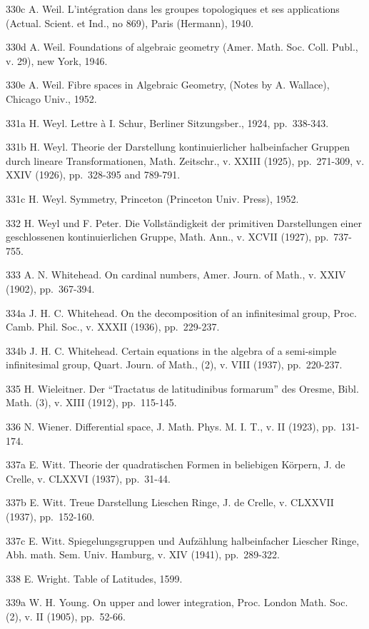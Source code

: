 330c A. Weil. L'intégration dans les groupes topologiques et ses applications (Actual. Scient. et Ind., no 869), Paris (Hermann), 1940.

330d A. Weil. Foundations of algebraic geometry (Amer. Math. Soc. Coll. Publ., v. 29), new York, 1946.

330e A. Weil. Fibre spaces in Algebraic Geometry, (Notes by A. Wallace), Chicago Univ., 1952.

331a H. Weyl. Lettre à I. Schur, Berliner Sitzungsber., 1924, pp.~338-343.

331b H. Weyl. Theorie der Darstellung kontinuierlicher halbeinfacher Gruppen durch lineare Transformationen, Math. Zeitschr., v. XXIII (1925), pp.~271-309, v. XXIV (1926), pp.~328-395 and 789-791.

331c H. Weyl. Symmetry, Princeton (Princeton Univ. Press), 1952.

332 H. Weyl und F. Peter. Die Vollständigkeit der primitiven Darstellungen einer geschlossenen kontinuierlichen Gruppe, Math. Ann., v. XCVII (1927), pp.~737-755.

333 A. N. Whitehead. On cardinal numbers, Amer. Journ. of Math., v. XXIV (1902), pp.~367-394.

334a J. H. C. Whitehead. On the decomposition of an infinitesimal group, Proc. Camb. Phil. Soc., v. XXXII (1936), pp.~229-237.

334b J. H. C. Whitehead. Certain equations in the algebra of a semi-simple infinitesimal group, Quart. Journ. of Math., (2), v. VIII (1937), pp.~220-237.

335 H. Wieleitner. Der ``Tractatus de latitudinibus formarum'' des Oresme, Bibl. Math. (3), v. XIII (1912), pp.~115-145.

336 N. Wiener. Differential space, J. Math. Phys. M. I. T., v. II (1923), pp.~131-174.

337a E. Witt. Theorie der quadratischen Formen in beliebigen Körpern, J. de Crelle, v. CLXXVI (1937), pp.~31-44.

337b E. Witt. Treue Darstellung Lieschen Ringe, J. de Crelle, v. CLXXVII (1937), pp.~152-160.

337c E. Witt. Spiegelungsgruppen und Aufzählung halbeinfacher Liescher Ringe, Abh. math. Sem. Univ. Hamburg, v. XIV (1941), pp.~289-322.

338 E. Wright. Table of Latitudes, 1599.

339a W. H. Young. On upper and lower integration, Proc. London Math. Soc. (2), v. II (1905), pp.~52-66.

